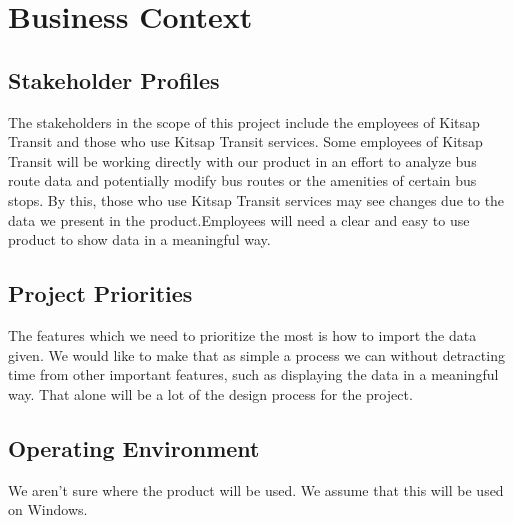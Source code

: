 \documentclass{article}
\begin{document}
\section{Business Context}

\subsection{Stakeholder Profiles}
The stakeholders in the scope of this project include the employees of Kitsap Transit
and those who use Kitsap Transit services. Some employees of Kitsap Transit will be
working directly with our product in an effort to analyze bus route data and potentially
modify bus routes or the amenities of certain bus stops. By this, those who use Kitsap
Transit services may see changes due to the data we present in the product.Employees will
need a clear and easy to use product to show data in a meaningful way.

\subsection{Project Priorities}
The features which we need to prioritize the most is how to import the data given. We would like to make that as simple a process we can without detracting time from other important features, such as displaying the data in a meaningful way. That alone will be a lot of the design process for the project. 

\subsection{Operating Environment}
We aren't sure where the product will be used. We assume that this will be used on Windows.
\end{document}
